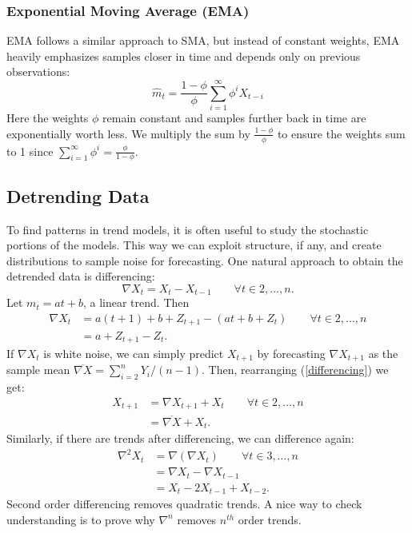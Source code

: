 \documentclass{article}
\begin{document}
\subsubsection{Exponential Moving Average (EMA)}
EMA follows a similar approach to SMA, but instead of constant weights, EMA heavily emphasizes samples closer in time and depends only on previous observations:
\begin{equation}\label{EMA}
    \hat{m}_t=\frac{1-\phi}{\phi} \sum_{i=1}^\infty \phi^i X_{t-i}
\end{equation}
Here the weights $\phi$ remain constant and samples further back in time are exponentially worth less. We multiply the sum by $\frac{1-\phi}{\phi}$ to ensure the weights sum to 1 since $\sum_{i=1}^\infty \phi^i=\frac{\phi}{1-\phi}$.

\subsection{Detrending Data}
To find patterns in trend models, it is often useful to study the stochastic portions of the models. This way we can exploit structure, if any, and create distributions to sample noise for forecasting. One natural approach to obtain the detrended data is differencing:
\begin{equation}\label{differencing}
    \nabla X_t = X_t - X_{t-1} \qquad \forall t \in 2, \ldots, n.
\end{equation}
Let $m_t=at+b$, a linear trend. Then
\begin{align}\label{differencing simplified}
    \nabla X_t &= a(t+1)+b+Z_{t+1}-(at+b+Z_t) \qquad \forall t \in 2, \ldots, n \nonumber \\
    &=a+Z_{t+1}-Z_t.
\end{align}
If $\nabla X_t$ is white noise, we can simply predict $X_{t+1}$ by forecasting $\nabla X_{t+1}$ as the sample mean $\overline{\nabla X}=\sum_{i=2}^n Y_i/(n-1)$. Then, rearranging (\ref{differencing}) we get:
\begin{align}\label{differencing forecast}
    X_{t+1} &= \nabla X_{t+1} + X_t \qquad \forall t \in 2, \ldots, n \nonumber \\
    &= \overline{\nabla X} + X_t.
\end{align}
Similarly, if there are trends after differencing, we can difference again:
\begin{align}\label{differencing quadratic}
    \nabla^2 X_{t} &= \nabla(\nabla X_t) \qquad \forall t \in 3, \ldots, n \nonumber \\
    &= \nabla X_t - \nabla X_{t-1}\nonumber\\
    &= X_t -2X_{t-1}+X_{t-2}.
\end{align}
Second order differencing removes quadratic trends. A nice way to check understanding is to prove why $\nabla^n$ removes $n^{th}$ order trends.
\end{document}
